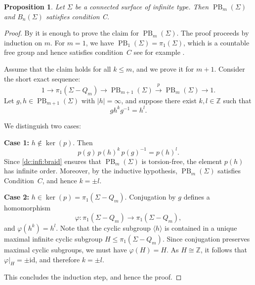 \documentclass[a4paper,12pt,leqno]{amsart}
\newtheorem{proposition}[theorem]{Proposition}
\theoremstyle{definition}
\DeclareMathOperator{\pb}{PB}
\begin{document}
\begin{proposition}\label{pure:braid:group:condition:c:inifinite}
Let \( \Sigma \) be a connected surface of infinite type. Then \( \pb_{m}(\Sigma) \) and $B_n(\Sigma)$ satisfies condition C.
\end{proposition}
\begin{proof}
By \cite[Lemma 4.14]{MR1760573} it is enough to prove the claim for \( \pb_{m}(\Sigma) \).
The proof proceeds by induction on \( m \). For \( m = 1 \), we have \( \pb_{1}(\Sigma) = \pi_1(\Sigma) \), which is a countable free group and hence satisfies condition~\( C \) see for example \cite[Lemma 2.3]{MR4817678}.

Assume that the claim holds for all \( k \leq m \), and we prove it for \( m+1 \). Consider the short exact sequence:
\[
1 \longrightarrow \pi_1(\Sigma - Q_m) \longrightarrow \pb_{m+1}(\Sigma) \xrightarrow{p} \pb_m(\Sigma) \longrightarrow 1.
\]
Let \( g, h \in \pb_{m+1}(\Sigma) \) with \( |h| = \infty \), and suppose there exist \( k, l \in \mathbb{Z} \) such that
\[
g h^k g^{-1} = h^l.
\]

We distinguish two cases:

\medskip
\noindent
\textbf{Case 1:} \( h \notin \ker(p) \). Then
\[
p(g) \, p(h)^k \, p(g)^{-1} = p(h)^l.
\]
Since \cref{dc:infi:braid} ensures that \( \pb_m(\Sigma) \) is torsion-free, the element \( p(h) \) has infinite order. Moreover, by the inductive hypothesis, \( \pb_m(\Sigma) \) satisfies Condition~\( C \), and hence \( k = \pm l \).


\medskip
\noindent
\textbf{Case 2:} \( h \in \ker(p) = \pi_1(\Sigma - Q_m) \). Conjugation by \( g \) defines a homomorphism
\[
\varphi \colon \pi_1(\Sigma - Q_m) \longrightarrow \pi_1(\Sigma - Q_m),
\]
and \( \varphi(h^k) = h^l \). Note that the cyclic subgroup \( \langle h \rangle \) is contained in a unique maximal infinite cyclic subgroup \( H \leq \pi_1(\Sigma - Q_m) \). Since conjugation preserves maximal cyclic subgroups, we must have \( \varphi(H) = H \). As \( H \cong \mathbb{Z} \), it follows that \( \varphi|_H = \pm \mathrm{id} \), and therefore \( k = \pm l \).

\medskip
\noindent
This concludes the induction step, and hence the proof.
\end{proof}
\end{document}
